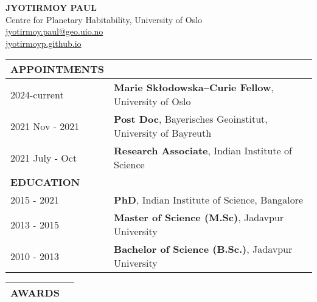 \documentclass[11pt,a4paper]{article}
\begin{document}
\begin{center}
\textbf{{\Large JYOTIRMOY PAUL}}\\
Centre for Planetary Habitability, University of Oslo\\
\faEnvelope \quad \href{mailto:jyotirmoy.paul@geo.uio.no}{jyotirmoy.paul@geo.uio.no}\\
 \href{https://jyotirmoyp.github.io}{jyotirmoyp.github.io} \quad
\href{https://orcid.org/0000-0002-7972-1868}{} \quad %
\quad \href{https://github.com/Jyotirmoyp}{}
\end{center}

\vspace{-0.3 in}
\begin{longtable}{p{5cm} p{10 cm}}
    


\hline
\textbf{APPOINTMENTS} &  \\
\hline 
2024-current & \textbf{Marie Skłodowska–Curie Fellow}, University of Oslo \\
2021 Nov - 2021  & \textbf{Post Doc}, Bayerisches Geoinstitut, University of Bayreuth \\

2021 July - Oct & \textbf{Research Associate}, Indian Institute of Science \\
\hline


\textbf{EDUCATION} &  \\

\hline
2015 - 2021 & \textbf{PhD}, Indian Institute of Science, Bangalore\\

2013 - 2015 & \textbf{Master of Science (M.Sc)}, Jadavpur University
\\

2010 - 2013 & \textbf{Bachelor of Science (B.Sc.)}, Jadavpur University


\end{longtable}
\vspace{-0.5 in}
\begin{longtable}{p{10 cm} p{5 cm}}
\hline
\textbf{AWARDS}& \\
\hline
\end{longtable}
\vspace{-0.3 in}
\end{document}
